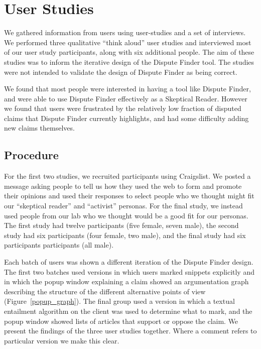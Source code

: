 \documentclass{www2010-submission}
\begin{document}
\section{User Studies}
\label{sec:interviews}
\label{user-studies}

We gathered information from users using user-studies and a set of interviews. We performed three qualitative ``think aloud'' user studies and interviewed most of our user study participants, along with six additional people. The aim of these studies was to inform the iterative design of the Dispute Finder tool. The studies were not intended to validate the design of Dispute Finder as being correct. 

We found that most people were interested in having a tool like Dispute Finder, and were able to use Dispute Finder effectively as a Skeptical Reader. However we found that users were frustrated by the relatively low fraction of disputed claims that Dispute Finder currently highlights, and had some difficulty adding new claims themselves.


\subsection{Procedure}

For the first two studies, we recruited participants using Craigslist. We posted a message asking people to tell us how they used the web to form and promote their opinions and used their responses to select people who we thought might fit our ``skeptical reader'' and ``activist'' personas. For the final study, we instead used people from our lab who we thought would be a good fit for our personas. The first study had twelve participants (five female, seven male), the second study had six participants (four female, two male), and the final study had six participants participants (all male). 

Each batch of users was shown a different iteration of the Dispute Finder design. The first two batches used versions in which users marked snippets explicitly and in which the popup window explaining a claim showed an argumentation graph describing the structure of the different alternative points of view (Figure~\ref{popup_graph}). The final group used a version in which a textual entailment algorithm on the client was used to determine what to mark, and the popup window showed lists of articles that support or oppose the claim. We present the findings of the three user studies together. Where a comment refers to particular version we make this clear.
\end{document}
